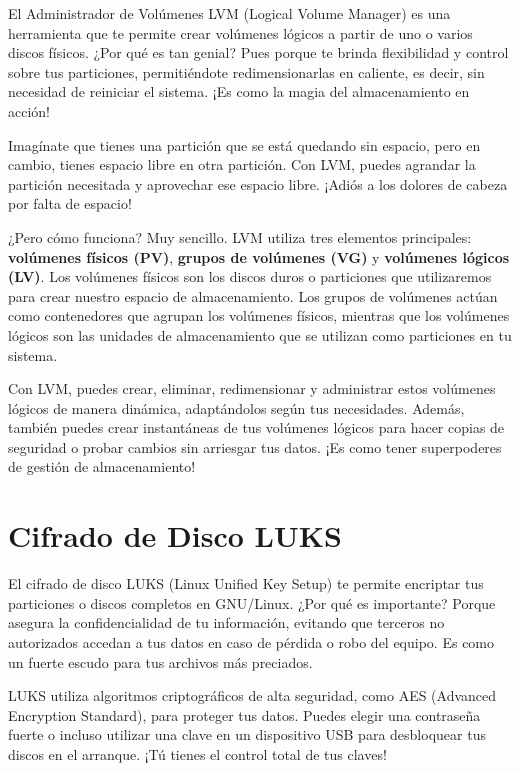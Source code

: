 \documentclass[
  letterpaper,
  DIV=11,
  numbers=noendperiod]{scrartcl}
\begin{document}
El Administrador de Volúmenes LVM (Logical Volume Manager) es una
herramienta que te permite crear volúmenes lógicos a partir de uno o
varios discos físicos. ¿Por qué es tan genial? Pues porque te brinda
flexibilidad y control sobre tus particiones, permitiéndote
redimensionarlas en caliente, es decir, sin necesidad de reiniciar el
sistema. ¡Es como la magia del almacenamiento en acción!

Imagínate que tienes una partición que se está quedando sin espacio,
pero en cambio, tienes espacio libre en otra partición. Con LVM, puedes
agrandar la partición necesitada y aprovechar ese espacio libre. ¡Adiós
a los dolores de cabeza por falta de espacio!

¿Pero cómo funciona? Muy sencillo. LVM utiliza tres elementos
principales: \textbf{volúmenes físicos (PV)}, \textbf{grupos de
volúmenes (VG)} y \textbf{volúmenes lógicos (LV)}. Los volúmenes físicos
son los discos duros o particiones que utilizaremos para crear nuestro
espacio de almacenamiento. Los grupos de volúmenes actúan como
contenedores que agrupan los volúmenes físicos, mientras que los
volúmenes lógicos son las unidades de almacenamiento que se utilizan
como particiones en tu sistema.

Con LVM, puedes crear, eliminar, redimensionar y administrar estos
volúmenes lógicos de manera dinámica, adaptándolos según tus
necesidades. Además, también puedes crear instantáneas de tus volúmenes
lógicos para hacer copias de seguridad o probar cambios sin arriesgar
tus datos. ¡Es como tener superpoderes de gestión de almacenamiento!

\hypertarget{cifrado-de-disco-luks}{%
\section{Cifrado de Disco LUKS}\label{cifrado-de-disco-luks}}

El cifrado de disco LUKS (Linux Unified Key Setup) te permite encriptar
tus particiones o discos completos en GNU/Linux. ¿Por qué es importante?
Porque asegura la confidencialidad de tu información, evitando que
terceros no autorizados accedan a tus datos en caso de pérdida o robo
del equipo. Es como un fuerte escudo para tus archivos más preciados.

LUKS utiliza algoritmos criptográficos de alta seguridad, como AES
(Advanced Encryption Standard), para proteger tus datos. Puedes elegir
una contraseña fuerte o incluso utilizar una clave en un dispositivo USB
para desbloquear tus discos en el arranque. ¡Tú tienes el control total
de tus claves!
\end{document}
